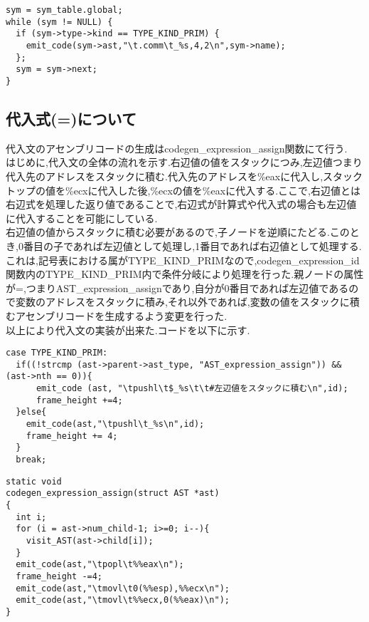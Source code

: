 \documentclass[10pt]{jsarticle}
\begin{document}
\begin{lstlisting}[caption=大域変数の宣言,label=大域変数]
sym = sym_table.global;
while (sym != NULL) {
  if (sym->type->kind == TYPE_KIND_PRIM) {
    emit_code(sym->ast,"\t.comm\t_%s,4,2\n",sym->name);
  };
  sym = sym->next;
}
\end{lstlisting}

\subsection{代入式(=)について}
代入文のアセンブリコードの生成はcodegen\_expression\_assign関数にて行う.\\
はじめに,代入文の全体の流れを示す.右辺値の値をスタックにつみ,左辺値つまり代入先のアドレスをスタックに積む.代入先のアドレスを\%eaxに代入し,スタックトップの値を\%ecxに代入した後,\%ecxの値を\%eaxに代入する.ここで,右辺値とは右辺式を処理した返り値であることで,右辺式が計算式や代入式の場合も左辺値に代入することを可能にしている.\\
右辺値の値からスタックに積む必要があるので,子ノードを逆順にたどる.このとき,0番目の子であれば左辺値として処理し,1番目であれば右辺値として処理する.これは,記号表における属がTYPE\_KIND\_PRIMなので,codegen\_expression\_id関数内のTYPE\_KIND\_PRIM内で条件分岐により処理を行った.親ノードの属性が=,つまりAST\_expression\_assignであり,自分が0番目であれば左辺値であるので変数のアドレスをスタックに積み,それ以外であれば,変数の値をスタックに積むアセンブリコードを生成するよう変更を行った.\\
以上により代入文の実装が出来た.コードを以下に示す.

\begin{lstlisting}[caption=TYPE\_KIND\_PRIMにおける変更点]
case TYPE_KIND_PRIM:
  if((!strcmp (ast->parent->ast_type, "AST_expression_assign")) && (ast->nth == 0)){
      emit_code (ast, "\tpushl\t$_%s\t\t#左辺値をスタックに積む\n",id);
      frame_height +=4;
  }else{
    emit_code(ast,"\tpushl\t_%s\n",id);
    frame_height += 4;
  }
  break;
\end{lstlisting}

\begin{lstlisting}[caption=codegen\_expression\_assign関数]
static void
codegen_expression_assign(struct AST *ast)
{
  int i;
  for (i = ast->num_child-1; i>=0; i--){
    visit_AST(ast->child[i]);
  }
  emit_code(ast,"\tpopl\t%%eax\n");
  frame_height -=4;
  emit_code(ast,"\tmovl\t0(%%esp),%%ecx\n");
  emit_code(ast,"\tmovl\t%%ecx,0(%%eax)\n");
}
\end{lstlisting}
\end{document}
